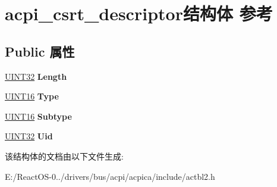 \hypertarget{structacpi__csrt__descriptor}{}\section{acpi\+\_\+csrt\+\_\+descriptor结构体 参考}
\label{structacpi__csrt__descriptor}
\subsection*{Public 属性}
\begin{DoxyCompactItemize}
\item 
\mbox{\label{structacpi__csrt__descriptor_a3dd156cf6ca44918253a8fcb906bb89b}} 
\hyperlink{_processor_bind_8h_ae1e6edbbc26d6fbc71a90190d0266018}{U\+I\+N\+T32} {\bfseries Length}
\item 
\mbox{\label{structacpi__csrt__descriptor_a72a52410288780c788c80812feb9c8af}} 
\hyperlink{_processor_bind_8h_a09f1a1fb2293e33483cc8d44aefb1eb1}{U\+I\+N\+T16} {\bfseries Type}
\item 
\mbox{\label{structacpi__csrt__descriptor_aaad3e0fedcdabccd4e2bc98baa10e4ce}} 
\hyperlink{_processor_bind_8h_a09f1a1fb2293e33483cc8d44aefb1eb1}{U\+I\+N\+T16} {\bfseries Subtype}
\item 
\mbox{\label{structacpi__csrt__descriptor_a25d1ffe371c7ddfa2e34c9862336faa2}} 
\hyperlink{_processor_bind_8h_ae1e6edbbc26d6fbc71a90190d0266018}{U\+I\+N\+T32} {\bfseries Uid}
\end{DoxyCompactItemize}


该结构体的文档由以下文件生成\+:\begin{DoxyCompactItemize}
\item 
E\+:/\+React\+O\+S-\/0../drivers/bus/acpi/acpica/include/actbl2.\+h\end{DoxyCompactItemize}
